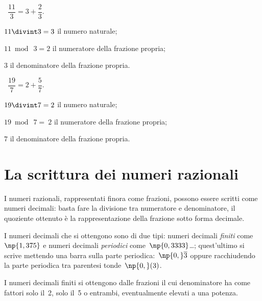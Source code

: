 \begin{exrig}
 \begin{esempio}
 ~$\dfrac{11}{3}=3+\dfrac{2}{3}$.
  \begin{itemize*}
   \item $11\divint 3 =3$ il numero naturale;
   \item $11\bmod~3 =2$ il numeratore della frazione propria;
   \item $3$ il denominatore della frazione propria.
  \end{itemize*}
 \end{esempio}

 \begin{esempio}
 ~$\dfrac{19}{7}=2+\dfrac{5}{7}$.
  \begin{itemize*}
   \item $19\divint 7=2$ il numero naturale;
   \item $19\bmod~7 =~2$ il numeratore della frazione propria;
   \item $7$ il denominatore della frazione propria.
  \end{itemize*}
 \end{esempio}
\end{exrig}

\ovalbox{\risolvi \ref{ese:3.22}}

\section{La scrittura dei numeri razionali}

I numeri razionali, rappresentati finora come frazioni, possono essere scritti come numeri decimali:
basta fare la divisione tra numeratore e denominatore, il quoziente ottenuto è la
rappresentazione della frazione sotto forma decimale.

\begin{center}
 
\end{center}

I numeri decimali che si ottengono sono di due tipi: numeri decimali \emph{finiti} come~$\np{1,375}$ e
numeri decimali \emph{periodici} come~$\np{0,3333}$\ldots;
quest'ultimo si scrive mettendo una barra sulla parte periodica:~$\np{0,}\overline3$ oppure racchiudendo la parte periodica
tra parentesi tonde~$\np{0,}(3)$.

I numeri decimali finiti si ottengono dalle frazioni il cui denominatore ha come fattori solo il~2,
solo il~5 o entrambi, eventualmente elevati a una potenza.

